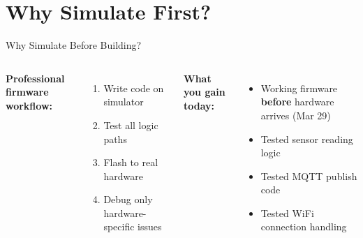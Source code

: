 \documentclass[aspectratio=169,11pt]{beamer}
\begin{document}
\section{Why Simulate First?}

\begin{frame}[shrink=5]{Why Simulate Before Building?}
    \begin{columns}
        \textbf{Professional firmware workflow:}
        \begin{enumerate}
            \item Write code on simulator
            \item Test all logic paths
            \item Flash to real hardware
            \item Debug only hardware-specific issues
        \end{enumerate}

        \vspace{0.2cm}
        \textbf{What you gain today:}
        \begin{itemize}
            \item Working firmware \textbf{before} hardware arrives (Mar 29)
            \item Tested sensor reading logic
            \item Tested MQTT publish code
            \item Tested WiFi connection handling
        \end{itemize}

\end{columns}
\end{frame}
\end{document}
